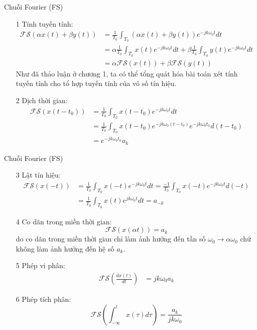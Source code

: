 \documentclass[8pt]{beamer}
\begin{document}
\begin{frame}{Chuỗi Fourier (FS)}
\begin{enumerate}
	\item[1] Tính tuyến tính:
\begin{equation*}
\begin{split}
	\mathscr{FS}(\alpha x(t)+\beta y(t))&=\frac{1}{T_{0}}\int_{T_{0}}(\alpha x(t)+\beta y(t))e^{-jk\omega_{0}t}dt\\
					    &= \alpha\frac{1}{T_{0}}\int_{T_{0}}x(t)e^{-jk\omega_{0}t}dt+\beta\frac{1}{T_{0}}\int_{T_{0}}y(t)e^{-jk\omega_{0}t}dt\\
					    &= \alpha\mathscr{FS}(x(t))+\beta\mathscr{FS}(y(t))
\end{split}
\end{equation*}
Như đã thảo luận ở \alert{chương 1}, ta có thể tổng quát hóa bài toán xét tính tuyến tính cho tổ hợp tuyến tính của vô số tín hiệu.
\item[2] Dịch thời gian:
\begin{equation*}
\begin{split}
	\mathscr{FS}(x(t-t_{0}))&=\frac{1}{T_{0}}\int_{T_{0}}x(t-t_{0})e^{-jk\omega_{0}t}dt\\
				&= \frac{1}{T_{0}}\int_{T_{0}}x(t-t_{0})e^{-jk\omega_{0}(t-t_{0})}e^{-jk\omega_{0}{t_{0}}}d(t-t_{0})\\
				&= e^{-jk\omega_{0}t_{0}}a_{k}
\end{split}
\end{equation*}
\end{enumerate}
\end{frame}
\begin{frame}{Chuỗi Fourier (FS)}
\begin{enumerate}
	\item[3] Lật tín hiệu:
\begin{equation*}
\begin{split}
	\mathscr{FS}(x(-t))&=\frac{1}{T_{0}}\int_{T_{0}}x(-t)e^{-jk\omega_{0}t}dt=\frac{-1}{T_{0}}\int_{T_{0}}x(-t)e^{-jk\omega_{0}t}d(-t)\\
			   &= \frac{1}{T_{0}}\int_{T_{0}}x(t)e^{jk\omega_{0}t}dt=a_{-k}
\end{split}
\end{equation*}
\item[4] Co dãn trong miền thời gian:
$$\mathscr{FS}(x(\alpha t))=a_{k}$$
do co dãn trong miền thời gian chỉ làm ảnh hưởng đến tần số $\omega_{0}\to \alpha\omega_{0}$ chứ không làm ảnh hưởng đến hệ số $a_{k}$.
\item[5] Phép vi phân:
\begin{equation*}
\begin{split}
\mathscr{FS}\left(\frac{dx(t)}{dt}\right)&=jk\omega_{0}a_{k}
\end{split}
\end{equation*}
\item [6] Phép tích phân:
	$$\mathscr{FS}\left(\int_{-\infty}^{t}x(\tau)d\tau\right)=\frac{a_{k}}{jk\omega_{0}}$$
\end{enumerate}
\end{frame}
\end{document}
